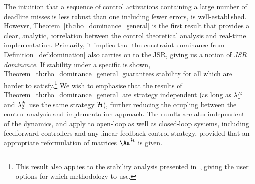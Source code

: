 The intuition that a sequence of control activations containing a large number of deadline misses is less robust than one including fewer errors, is well-established.
However, Theorem~\ref{th:rho_dominance_general} is the first result that provides a clear, analytic, correlation between the control theoretical analysis and real-time implementation.
Primarily, it implies that the constraint dominance from Definition~\ref{def:domination} also carries on to the JSR, giving us a notion of \emph{JSR dominance}.
If stability under a specific \ewhc{} is shown, Theorem~\ref{th:rho_dominance_general} guarantees stability for all \ewhc{} which are harder to satisfy.\footnote{This result also applies to the stability analysis presented in~\cite{Maggio:2020}, giving the user options for which methodology to use.}
We wish to emphasise that the results of Theorem~\ref{th:rho_dominance_general} are strategy independent (as long as $\lambda^{\mathcal{H}}_1$ and $\lambda^{\mathcal{H}}_2$ use the same strategy $\mathcal{H}$), further reducing the coupling between the control analysis and implementation approach.
The results are also independent of the dynamics, and apply to open-loop as well as closed-loop systems, including feedforward controllers and any linear feedback control strategy, provided that an appropriate reformulation of matrices $\Aa^\strat$ is given.

